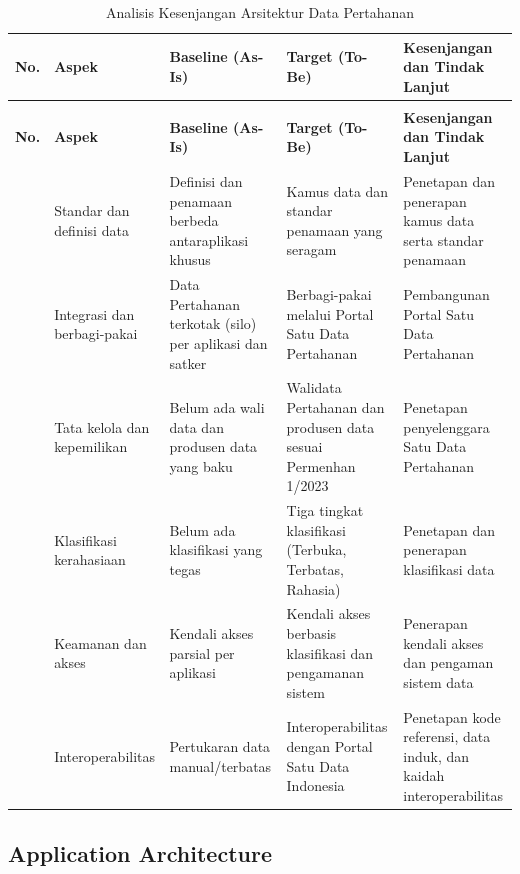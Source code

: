 {\small
\begin{longtable}{@{}>{\raggedright\arraybackslash}p{}>{\raggedright\arraybackslash}p{}>{\raggedright\arraybackslash}p{}>{\raggedright\arraybackslash}p{}>{\raggedright\arraybackslash}p{}@{}}
\caption{Analisis Kesenjangan Arsitektur Data Pertahanan}
\label{tab:d4-16}\\
\toprule
\textbf{No.} & \textbf{Aspek} & \textbf{Baseline (As-Is)} & \textbf{Target (To-Be)} & \textbf{Kesenjangan dan Tindak Lanjut}\\
\midrule
\endfirsthead
\multicolumn{5}{@{}l}{\small\itshape \tablename\ \thetable{} (lanjutan)}\\
\toprule
\textbf{No.} & \textbf{Aspek} & \textbf{Baseline (As-Is)} & \textbf{Target (To-Be)} & \textbf{Kesenjangan dan Tindak Lanjut}\\
\midrule
\endhead
\bottomrule
\endlastfoot
1 & Standar dan definisi data & Definisi dan penamaan berbeda antaraplikasi khusus & Kamus data dan standar penamaan yang seragam & Penetapan dan penerapan kamus data serta standar penamaan\\
2 & Integrasi dan berbagi-pakai & Data Pertahanan terkotak (silo) per aplikasi dan satker & Berbagi-pakai melalui Portal Satu Data Pertahanan & Pembangunan Portal Satu Data Pertahanan\\
3 & Tata kelola dan kepemilikan & Belum ada wali data dan produsen data yang baku & Walidata Pertahanan dan produsen data sesuai Permenhan 1/2023 & Penetapan penyelenggara Satu Data Pertahanan\\
4 & Klasifikasi kerahasiaan & Belum ada klasifikasi yang tegas & Tiga tingkat klasifikasi (Terbuka, Terbatas, Rahasia) & Penetapan dan penerapan klasifikasi data\\
5 & Keamanan dan akses & Kendali akses parsial per aplikasi & Kendali akses berbasis klasifikasi dan pengamanan sistem & Penerapan kendali akses dan pengaman sistem data\\
6 & Interoperabilitas & Pertukaran data manual/terbatas & Interoperabilitas dengan Portal Satu Data Indonesia & Penetapan kode referensi, data induk, dan kaidah interoperabilitas\\
\end{longtable}
}

\subsection{Application Architecture}

